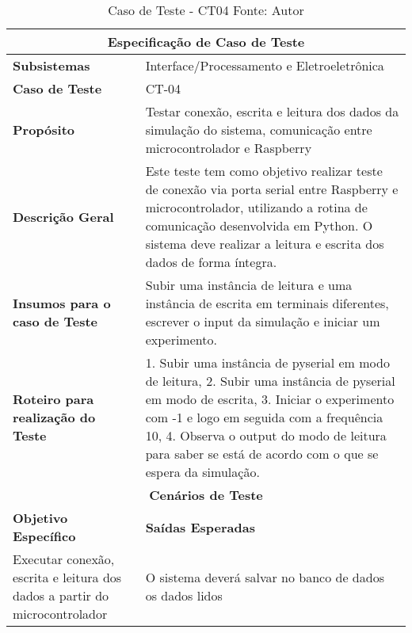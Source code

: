\begin{table}[H]
    \begin{center}
        \begin{tabular}{|p{5cm}|p{12cm}|}
            \hline
            \multicolumn{2}{|c|}{\textbf{Especificação de Caso de Teste}} \\ \hline
                \textbf{Subsistemas}                               & Interface/Processamento e Eletroeletrônica \\ \hline
                \textbf{Caso de Teste}                             & CT-04 \\ \hline
                \textbf{Propósito}                                     & Testar conexão, escrita e leitura dos dados da simulação do sistema, comunicação entre microcontrolador e Raspberry \\ \hline
                \textbf{Descrição Geral}                           & Este teste tem como objetivo realizar teste de conexão via porta serial entre Raspberry e microcontrolador, utilizando a rotina de comunicação desenvolvida em Python. O sistema deve realizar a leitura e escrita dos dados de forma íntegra. \\ \hline
                \textbf{Insumos para o caso de Teste}    & Subir uma instância de leitura e uma instância de escrita em terminais diferentes, escrever o input da simulação e iniciar um experimento. \\ \hline
                \textbf{Roteiro para realização do Teste}&  1. Subir uma instância de pyserial em modo de leitura, 2. Subir uma instância de pyserial em modo de escrita, 3. Iniciar o experimento com -1 e logo em seguida com a frequência 10, 4. Observa o output do modo de leitura para saber se está de acordo com o que se espera da simulação. \\ \hline
            \multicolumn{2}{|c|}{\textbf{Cenários de Teste}} \\ \hline
                \textbf{Objetivo Específico}                      & \textbf{Saídas Esperadas} \\ \hline
                Executar conexão, escrita e leitura dos dados a partir do microcontrolador & O sistema deverá salvar no banco de dados os dados lidos \\ \hline
        \end{tabular}
    \end{center}
    \caption[Caso de Teste - CT04]{Caso de Teste - CT04
    \protect Fonte: Autor}
    \label{CT-04}
\end{table}

